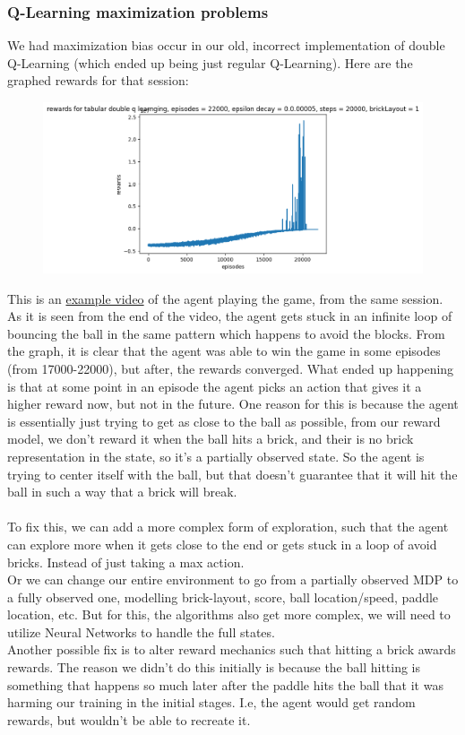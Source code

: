 \documentclass[twoside,11pt]{article}
\begin{document}
\subsubsection{Q-Learning maximization problems}
We had maximization bias occur in our old, incorrect implementation of double Q-Learning (which ended up being just regular Q-Learning). Here are the graphed rewards for that session:
\begin{figure}[H]
\includegraphics[scale=0.6]{Rewards_Double_Q_Learning_7}
\centering
\end{figure}
This is an \href{https://github.com/duoduocai-dot/csc498-project/blob/main/incorrect_double_q_learning_maximization_bias_example.mkv}{example video} of the agent playing the game, from  the same session. As it is seen from the end of the  video, the agent gets stuck in an infinite loop of bouncing the ball in the same pattern which happens to avoid the blocks. From the graph, it is clear that the agent was able to win the game in some episodes (from 17000-22000), but after, the rewards converged. What ended up happening is that at some point in an episode the agent picks an action that gives it a higher reward now, but not in the future. One reason for this is because the agent is essentially just trying to get as close to the ball as possible, from our reward model, we don't reward it when the ball hits a brick, and their is no brick representation in the state, so it's a partially observed state. So the agent is trying to center itself with the ball, but that doesn't guarantee that it will hit the ball in such a way that a brick will break.
\\\\
To fix this, we can add a more complex form of exploration, such that the agent can explore more when it gets close to the end or gets stuck in a loop of avoid bricks. Instead of just taking a max action.
\\
Or we can change our entire environment to go from a partially observed MDP to a fully observed one, modelling brick-layout, score, ball location/speed, paddle location, etc. But for this, the algorithms also get more complex, we will need to utilize Neural Networks to handle the full states.
\\
Another possible fix is to alter reward mechanics such that hitting a brick awards rewards. The reason we didn't do this initially is because the ball hitting is something that happens so much later after the paddle hits the ball that it was harming our training in the initial stages. I.e, the agent would get random rewards, but wouldn't be able to recreate it.
\end{document}
